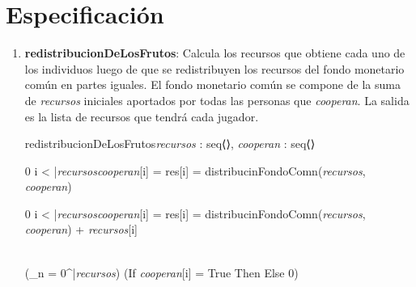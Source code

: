 \documentclass[10pt,a4paper]{article}
\begin{document}
\section{Especificación} 

\begin{enumerate}
    \item \textbf{redistribucionDeLosFrutos}: Calcula los recursos que obtiene cada uno de los individuos luego de que se redistribuyen
    los recursos del fondo monetario común en partes iguales. El fondo monetario común se compone de la suma de \textit{recursos} iniciales aportados por todas las personas que \textit{cooperan}. La salida es la lista de recursos que tendrá cada jugador.

    \begin{proc}{redistribucionDeLosFrutos}{\In \textit{recursos} : seq⟨\real⟩, \In \textit{cooperan} : }
    {seq⟨\real⟩}



    \end{proc}
    

    {
    {0 \leq i < |{\textit{recursos}}\vert \y  \textit{cooperan}[i] = \True \implicaLuego res[i] = 
    distribucinFondoComn(\textit{recursos}, \textit{cooperan})}}
    
    {
    {0 \leq i < |{\textit{recursos}}\vert \y  \textit{cooperan}[i] = \False \implicaLuego res[i] = 
    distribucinFondoComn(\textit{recursos}, \textit{cooperan}) + \textit{recursos}[i]}}

    {\\(\sum_{n = 0}^{|{\textit{recursos}}\vert})  
    (If \textit{cooperan}[i] = True \hspace{2mm}Then \hspace{2mm} \hspace{2mm} Else \hspace{2mm} 0)}
    


\end{enumerate}
\end{document}
